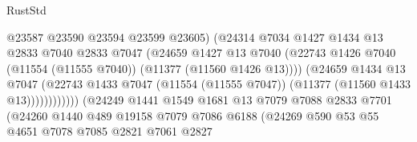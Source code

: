 \begin{lexlean}{RustStd}
\begin{coremodule}
                                          @23587
                                          @23590
                                          @23594
                                          @23599
                                          @23605)
                                        (@24314
                                          @7034
                                          @1427
                                          @1434
                                          @13
                                          @2833
                                          @7040
                                          @2833
                                          @7047
                                          (@24659
                                            @1427
                                            @13
                                            @7040
                                            (@22743
                                              @1426
                                              @7040
                                              (@11554 (@11555 @7040))
                                              (@11377 (@11560 @1426 @13))))
                                          (@24659
                                            @1434
                                            @13
                                            @7047
                                            (@22743
                                              @1433
                                              @7047
                                              (@11554 (@11555 @7047))
                                              (@11377 (@11560 @1433 @13))))))))))))
                          (@24249
                            @1441
                            @1549
                            @1681
                            @13
                            @7079
                            @7088
                            @2833
                            @7701
                            (@24260
                              @1440
                              @489
                              @19158
                              @7079
                              @7086
                              @6188
                              (@24269
                                @590
                                @53
                                @55
                                @4651
                                @7078
                                @7085
                                @2821
                                @7061
                                @2827

\end{coremodule}
\end{lexlean}
